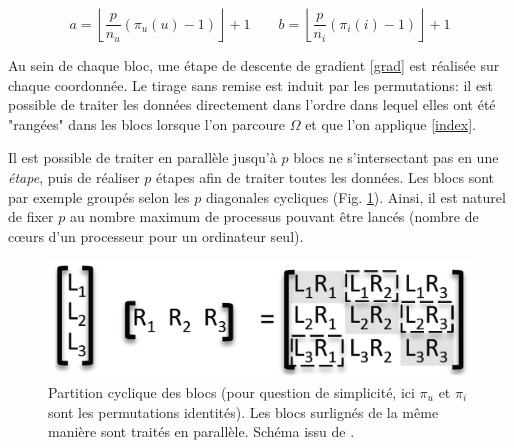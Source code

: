 \documentclass[10pt,a4paper]{article}
\begin{document}
\begin{equation}\label{index}
a=\left \lfloor \frac{p}{n_u}(\pi_u(u)-1) \right \rfloor +1 \quad \quad b=\left \lfloor \frac{p}{n_i}(\pi_i(i)-1) \right \rfloor +1
\end{equation}

Au sein de chaque bloc, une étape de descente de gradient \eqref{grad} est réalisée sur chaque coordonnée. Le tirage sans remise est induit par les permutations: il est possible de traiter les données directement dans l'ordre dans lequel elles ont été "rangées" dans les blocs lorsque l'on parcoure $\Omega$ et que l'on applique \eqref{index}.

Il est possible de traiter en parallèle jusqu'à $p$ blocs ne s'intersectant pas en une \emph{étape}, puis de réaliser $p$ étapes afin de traiter toutes les données. Les blocs sont par exemple groupés selon les $p$ diagonales cycliques (Fig. \ref{blocs}). Ainsi, il est naturel de fixer $p$ au nombre maximum de processus pouvant être lancés (nombre de cœurs d'un processeur pour un ordinateur seul).

\begin{figure}
\centering
\includegraphics[width=\textwidth]{fig/blocs}
\caption{Partition cyclique des blocs (pour question de simplicité, ici $\pi_u$ et $\pi_i$ sont les permutations identités). Les blocs surlignés de la même manière sont traités en parallèle. Schéma issu de \cite{jelly}.}
\label{blocs}
\end{figure}
\end{document}
